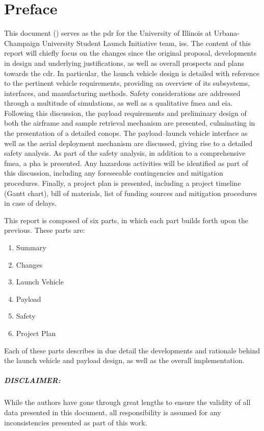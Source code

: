 \chapter{Preface}
	
This document (\texttt{\docno}) serves as the \gls{pdr} for the University of Illinois at Urbana-Champaign University Student Launch Initiative team, \gls{iss}. The content of this report will chiefly focus on the changes since the original proposal, developments in design and underlying justifications, as well as overall prospects and plans towards the \gls{cdr}. In particular, the launch vehicle design is detailed with reference to the pertinent vehicle requirements, providing an overview of its subsystems, interfaces, and manufacturing methods. Safety considerations are addressed through a multitude of simulations, as well as a qualitative \gls{fmea} and \gls{eia}. Following this discussion, the payload requirements and preliminary design of both the airframe and sample retrieval mechanism are presented, culminating in the presentation of a detailed \gls{conops}. The payload--launch vehicle interface as well as the aerial deployment mechanism are discussed, giving rise to a detailed safety analysis. As part of the safety analysis, in addition to a comprehensive \gls{fmea}, a \gls{pha} is presented. Any hazardous activities will be identified as part of this discussion, including any foreseeable contingencies and mitigation procedures. Finally, a project plan is presented, including a project timeline (Gantt chart), bill of materials, list of funding sources and mitigation procedures in case of delays.

This report is composed of six parts, in which each part builds forth upon the previous. These parts are:

\begin{enumerate}[noitemsep, label=\Roman*]
	\item Summary
	\item Changes
	\item Launch Vehicle
	\item Payload
	\item Safety
	\item Project Plan
\end{enumerate}

Each of these parts describes in due detail the developments and rationale behind the launch vehicle and payload design, as well as the overall implementation.

\paragraph{DISCLAIMER:}
While the authors have gone through great lengths to ensure the validity of all data presented in this document, all responsibility is assumed for any inconsistencies presented as part of this work. 